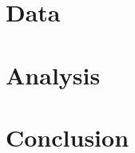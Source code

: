 \documentclass[12pt, letterpaper]{article}
\begin{document}
\section{Data}



\section{Analysis}


\section{Conclusion}






\clearpage


\end{document}
